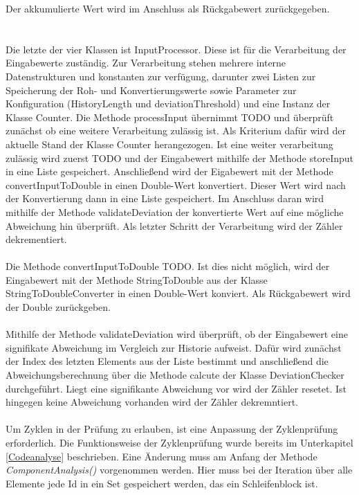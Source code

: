 \documentclass{article}
\begin{document}
    Der akkumulierte Wert wird im Anschluss als Rückgabewert zurückgegeben.\\
    \\
    \\
    Die letzte der vier Klassen ist InputProcessor.
    Diese ist für die Verarbeitung der Eingabewerte zuständig.
    Zur Verarbeitung stehen mehrere interne Datenstrukturen und konstanten zur verfügung, darunter zwei Listen zur Speicherung der Roh- und Konvertierungswerte sowie Parameter zur Konfiguration (HistoryLength und deviationThreshold) und eine Instanz der Klasse Counter.
    Die Methode processInput übernimmt TODO und überprüft zunächst ob eine weitere Verarbeitung zulässig ist. 
    Als Kriterium dafür wird der aktuelle Stand der Klasse Counter herangezogen.
    Ist eine weiter verarbeitung zulässig wird zuerst TODO und der Eingabewert mithilfe der Methode storeInput in eine Liste gespeichert.
    Anschließend wird der Eigabewert mit der Methode convertInputToDouble in einen Double-Wert konvertiert.
    Dieser Wert wird nach der Konvertierung dann in eine Liste gespeichert.
    Im Anschluss daran wird mithilfe der Methode validateDeviation der konvertierte Wert auf eine mögliche Abweichung hin überprüft.
    Als letzter Schritt der Verarbeitung wird der Zähler dekrementiert.\\
    \\
    Die Methode convertInputToDouble TODO. Ist dies nicht möglich, wird der Eingabewert mit der Methode StringToDouble aus der Klasse StringToDoubleConverter in einen Double-Wert konviert.
    Als Rückgabewert wird der Double zurückgeben.\\
    \\
    Mithilfe der Methode validateDeviation wird überprüft, ob der Eingabewert eine signifikate Abweichung im Vergleich zur Historie aufweist.
    Dafür wird zunächst der Index des letzten Elements aus der Liste bestimmt und anschließend die Abweichungsberechnung über die Methode calcute der Klasse DeviationChecker durchgeführt.
    Liegt eine signifikante Abweichung vor wird der Zähler resetet. Ist hingegen keine Abweichung vorhanden wird der Zähler dekremntiert.\\
    \\
    Um Zyklen in der Prüfung zu erlauben, ist eine Anpassung der Zyklenprüfung erforderlich.
    Die Funktionsweise der Zyklenprüfung wurde bereits im Unterkapitel \ref{Codeanalyse} beschrieben.
    Eine Änderung muss am Anfang der Methode \textit{ComponentAnalysis()} vorgenommen werden.
    Hier muss bei der Iteration über alle Elemente jede Id in ein Set gespeichert werden, das ein Schleifenblock ist.
\end{document}
